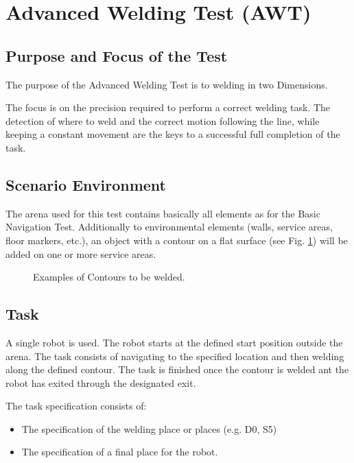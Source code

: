 \section{Advanced Welding Test (AWT)}

\subsection{Purpose and Focus of the Test}
The purpose of the Advanced Welding Test is to welding in two Dimensions. 
\par
The focus is on the precision required to perform a correct welding task. The detection of where to weld and the correct motion following the line, while keeping a constant movement are the keys to a successful full completion of the task. 

\subsection{Scenario Environment}
The arena used for this test contains basically all elements as for the Basic Navigation Test. Additionally to environmental elements (walls, service areas, floor markers, etc.), an object with a contour on a flat surface (see Fig. \ref{awt_examplecontour}) will be added on one or more service areas. 

\begin{figure}
\begin{center}
\end{center}

\caption{Examples of Contours to be welded.}
\label{awt_examplecontour}
\end{figure}


\subsection{Task}
A single robot is used. The robot starts at the defined start position outside the arena. The task consists of navigating to the specified location and then welding along the defined contour. The task is finished once the contour is welded ant the robot has exited through the designated exit.
\par
The task specification consists of: 
\begin{itemize}
	\item The specification of the welding place or places (e.g. D0, S5)
	\item The specification of a final place for the robot.
\end{itemize}

